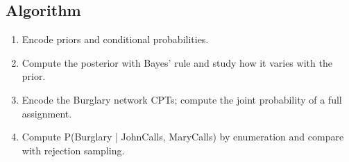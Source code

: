 \documentclass[11pt]{article}
\begin{document}
\subsection*{Algorithm}
\begin{algo}[Procedure]\begin{enumerate}
\item Encode priors and conditional probabilities.
\item Compute the posterior with Bayes' rule and study how it varies with the prior.
\item Encode the Burglary network CPTs; compute the joint probability of a full assignment.
\item Compute P(Burglary | JohnCalls, MaryCalls) by enumeration and compare with rejection sampling.
\end{enumerate}\end{algo}
\end{document}
